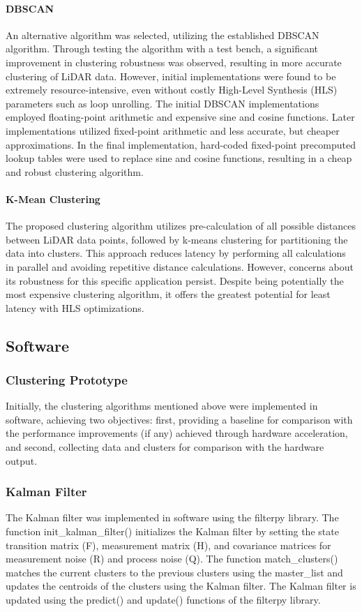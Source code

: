 \documentclass[journal]{IEEEtran} %
\begin{document}
\paragraph{DBSCAN}
An alternative algorithm was selected, utilizing the established DBSCAN algorithm. Through testing the algorithm with a test bench, a significant improvement in clustering robustness was observed, resulting in more accurate clustering of LiDAR data. However, initial implementations were found to be extremely resource-intensive, even without costly High-Level Synthesis (HLS) parameters such as loop unrolling. The initial DBSCAN implementations employed floating-point arithmetic and expensive sine and cosine functions. Later implementations utilized fixed-point arithmetic and less accurate, but cheaper approximations. In the final implementation, hard-coded fixed-point precomputed lookup tables were used to replace sine and cosine functions, resulting in a cheap and robust clustering algorithm.

\paragraph{K-Mean Clustering}
The proposed clustering algorithm utilizes pre-calculation of all possible distances between LiDAR data points, followed by k-means clustering for partitioning the data into clusters. This approach reduces latency by performing all calculations in parallel and avoiding repetitive distance calculations. However, concerns about its robustness for this specific application persist. Despite being potentially the most expensive clustering algorithm, it offers the greatest potential for least latency with HLS optimizations.

\subsection{Software}
\subsubsection{Clustering Prototype}
Initially, the clustering algorithms mentioned above were implemented in software, achieving two objectives: first, providing a baseline for comparison with the performance improvements (if any) achieved through hardware acceleration, and second, collecting data and clusters for comparison with the hardware output.


\subsubsection{Kalman Filter}
The Kalman filter was implemented in software using the filterpy library. The function init\_kalman\_filter() initializes the Kalman filter by setting the state transition matrix (F), measurement matrix (H), and covariance matrices for measurement noise (R) and process noise (Q). The function match\_clusters() matches the current clusters to the previous clusters using the master\_list and updates the centroids of the clusters using the Kalman filter. The Kalman filter is updated using the predict() and update() functions of the filterpy library. 
\end{document}
